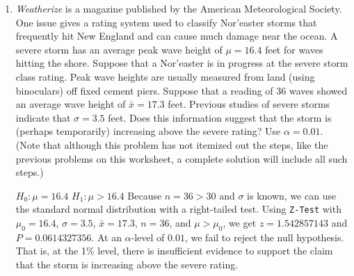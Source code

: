 \documentclass{article}
\newcommand{\answer}[1]{\color{red}#1}
\begin{document}
\begin{enumerate}
\item {\em Weatherize} is a magazine published by the American Meteorological Society. One issue gives a rating system used to classify Nor'easter storms that frequently hit New England and can cause much damage near the ocean. A severe storm has an average peak wave height of $\mu = 16.4$ feet for waves hitting the shore. Suppose that a Nor'easter is in progress at the severe storm class rating. Peak wave heights are usually measured from land (using binoculars) off fixed cement piers. Suppose that a reading of 36 waves showed an average wave height of $\bar{x} = 17.3$ feet. Previous studies of severe storms indicate that $\sigma = 3.5$ feet. Does this information suggest that the storm is (perhaps temporarily) increasing above the severe rating? Use $\alpha = 0.01$.  
(Note that although this problem has not itemized out the steps, like the previous problems on this worksheet, a complete solution will include all such steps.)  

{\answer $H_0: \mu = 16.4$  
$H_1: \mu > 16.4$  
Because $n=36 > 30$ and $\sigma$ is known, we can use the standard normal distribution with a right-tailed test.  
Using \texttt{Z-Test} with $\mu_0 = 16.4$, $\sigma = 3.5$, $\bar{x} = 17.3$, $n=36$, and $\mu > \mu_0$, we get $z = 1.542857143$ and $P = 0.0614327356$.  
At an $\alpha$-level of $0.01$, we fail to reject the null hypothesis.  That is, at the 1\% level, there is insufficient evidence to support the claim that the storm is increasing above the severe rating. }  


\end{enumerate}
\vfill
\end{document}
